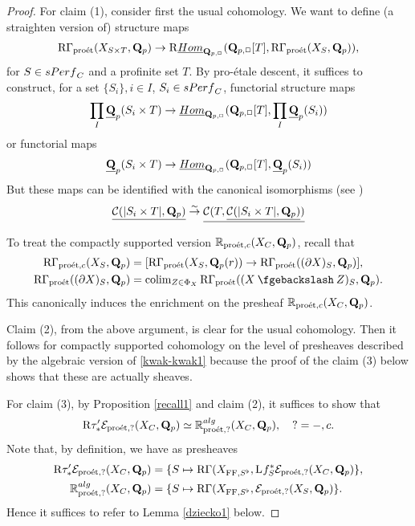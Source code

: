 \documentclass[10pt,reqno]{amsart}
\newcommand{\moins}{\mathbin{\fgebackslash}}
\theoremstyle{definition}
\theoremstyle{remark}
\newcommand{\colim}{\operatorname{colim} }
\newcommand{\proeet}{\operatorname{pro\acute{e}t} }
\newcommand{\uHom}{\underline{{\rm{Hom}} }}
\newcommand{\LL}{\operatorname{L} }
\newcommand{\FF}{\operatorname{FF} }
\newcommand{\scc}{{\mathcal{C}}}
\newcommand{\se}{{\mathcal{E}}}
\numberwithin{equation}{section}
\def\R{{\mathrm R}}
\def\Q{{\bf Q}} \def\Z{{\bf Z}}
\def\BORD{$\partial D_C$, $\partial X$}
\numberwithin{equation}{section}
\begin{document}
\begin{proof}   For claim (1), consider first the usual cohomology. 
We want to define (a straighten version of) structure maps
$$
\R\Gamma_{\proeet}(X_{S\times T},\Q_p)\to \R\uHom_{\Q_{p,\Box}}(\Q_{p,\Box}[T],\R\Gamma_{\proeet}(X_{S},\Q_p)),
$$
for $S\in {\rm sPerf}_C$ and a profinite set $T$.  By pro-\'etale descent, it suffices to construct, for a set $\{S_i\}, i\in I$, $S_i\in {\rm sPerf}_C$, functorial structure  maps
$$
\prod_I\underline{\Q}_p(S_i\times T)\to \uHom_{\Q_{p,\Box}}(\Q_{p,\Box}[T], \prod_I\underline{\Q}_p(S_i))
$$
or functorial maps
$$
\underline{\Q}_p(S_i\times T)\to \uHom_{\Q_{p,\Box}}(\Q_{p,\Box}[T], \underline{\Q}_p(S_i))
$$
But these maps can be identified with the canonical isomorphisms  (see \cite[Ex. 2.1]{TVS})
$$
\underline{\scc(|S_i\times T|,\Q_p)}\stackrel{\sim}{\to} \underline{\scc( T,\underline{\scc(|S_i\times T|,\Q_p)})}
$$
  
  To treat the compactly supported version ${\mathbb R}_{\proeet,c}(X_C,\Q_p)$, recall \index{BORD@\BORD}that
\begin{align}\label{kwak-kwak1}
\R\Gamma_{\proeet,c}(X_S,\Q_p) & =[\R\Gamma_{\proeet}(X_S,\Q_p(r))\to \R\Gamma_{\proeet}((\partial X)_S,\Q_p)],\\
\R\Gamma_{\proeet}((\partial X)_S,\Q_p) &=\colim_{Z\in\Phi_X}\R\Gamma_{\proeet}((X\moins Z)_S,\Q_p).\notag
\end{align}
This canonically induces  the  enrichment on the presheaf ${\mathbb R}_{\proeet,c}(X_C,\Q_p)$. 

   Claim (2), from the above argument, is clear for the usual cohomology.   Then it follows for compactly supported cohomology on the level of presheaves described by the algebraic version of \eqref{kwak-kwak1}  because the proof of the claim (3) below shows that these are actually sheaves. 
   
   For claim (3),     by Proposition \ref{recall1} and claim (2), it suffices to show that 
   $$
   \R\tau^{\prime}_*\se_{\proeet,?}(X_C,\Q_p) \simeq {\mathbb R}^{\rm alg}_{\proeet,?}(X_C,\Q_p),\quad ?=-,c.
   $$
   Note that, by definition, we have as  presheaves 
\begin{align*}
\R\tau^{\prime}_*\se_{\proeet,?}(X_C,\Q_p)  & =\{S\mapsto \R\Gamma(X_{\FF,S^{\flat}},\LL\hskip-.4mm f^*_S\se_{\proeet,?}(X_C,\Q_p)\},\\
{\mathbb R}^{\rm alg}_{\proeet,?}(X_C,\Q_p)&=\{S\mapsto \R\Gamma(X_{\FF,S^{\flat}},\se_{\proeet,?}(X_S,\Q_p)\}.
\end{align*}
Hence it suffices to refer to Lemma \ref{dziecko1} below.
\end{proof}
\end{document}
